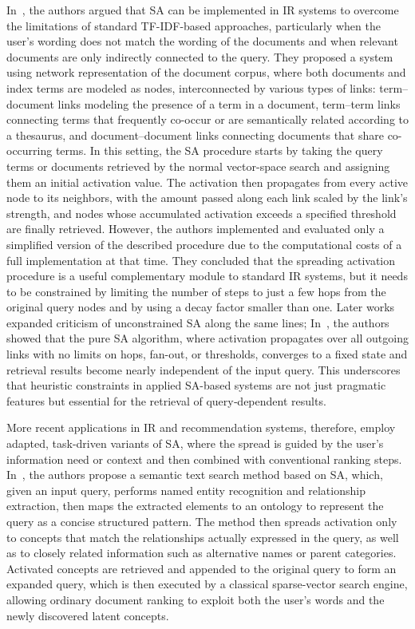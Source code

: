 \documentclass{article}
\begin{document}
In~\cite{salton1988use}, the authors argued that SA can be implemented in IR systems to overcome the limitations of standard TF-IDF-based approaches, particularly when the user’s wording does not match the wording of the documents and when relevant documents are only indirectly connected to the query. They proposed a system using network representation of the document corpus, where both documents and index terms are modeled as nodes, interconnected by various types of links: term–document links modeling the presence of a term in a document, term–term links connecting terms that frequently co-occur or are semantically related according to a thesaurus, and document–document links connecting documents that share co-occurring terms. In this setting, the SA procedure starts by taking the query terms or documents retrieved by the normal vector-space search and assigning them an initial activation value. The activation then propagates from every active node to its neighbors, with the amount passed along each link scaled by the link’s strength, and nodes whose accumulated activation exceeds a specified threshold are finally retrieved. However, the authors implemented and evaluated only a simplified version of the described procedure due to the computational costs of a full implementation at that time. They concluded that the spreading activation procedure is a useful complementary module to standard IR systems, but it needs to be constrained by limiting the number of steps to just a few hops from the original query nodes and by using a decay factor smaller than one. Later works expanded criticism of unconstrained SA along the same lines; In~\cite{berthold2009pure}, the authors showed that the pure SA algorithm, where activation propagates over all outgoing links with no limits on hops, fan-out, or thresholds, converges to a fixed state and retrieval results become nearly independent of the input query. This underscores that heuristic constraints in applied SA-based systems are not just pragmatic features but essential for the retrieval of query‐dependent results.

More recent applications in IR and recommendation systems, therefore, employ adapted, task-driven variants of SA, where the spread is guided by the user’s information need or context and then combined with conventional ranking steps. In~\cite{ngo2014discovering}, the authors propose a semantic text search method based on SA, which, given an input query, performs named entity recognition and relationship extraction, then maps the extracted elements to an ontology to represent the query as a concise structured pattern. The method then spreads activation only to concepts that match the relationships actually expressed in the query, as well as to closely related information such as alternative names or parent categories. Activated concepts are retrieved and appended to the original query to form an expanded query, which is then executed by a classical sparse-vector search engine, allowing ordinary document ranking to exploit both the user’s words and the newly discovered latent concepts.
\end{document}

